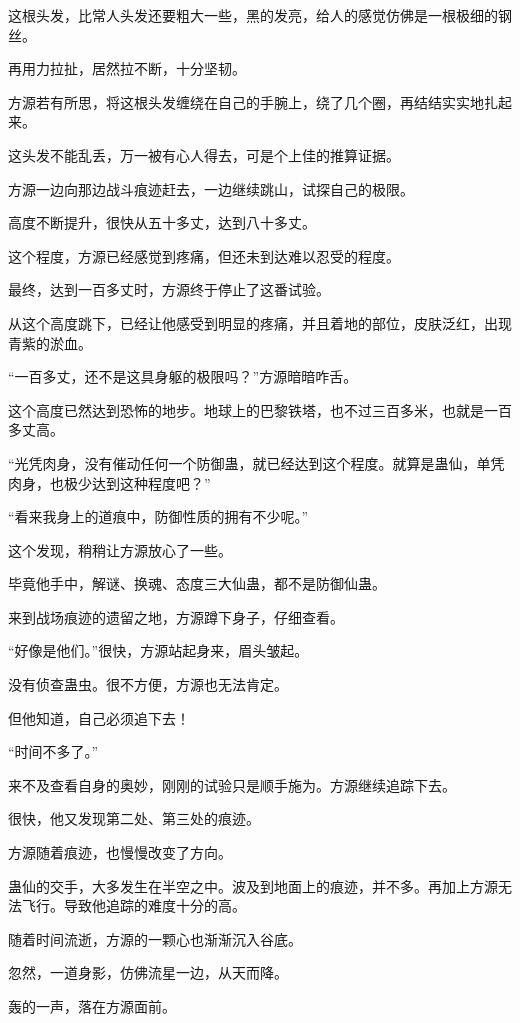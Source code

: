 \begin{this_body}
这根头发，比常人头发还要粗大一些，黑的发亮，给人的感觉仿佛是一根极细的钢丝。

再用力拉扯，居然拉不断，十分坚韧。

方源若有所思，将这根头发缠绕在自己的手腕上，绕了几个圈，再结结实实地扎起来。

这头发不能乱丢，万一被有心人得去，可是个上佳的推算证据。

方源一边向那边战斗痕迹赶去，一边继续跳山，试探自己的极限。

高度不断提升，很快从五十多丈，达到八十多丈。

这个程度，方源已经感觉到疼痛，但还未到达难以忍受的程度。

最终，达到一百多丈时，方源终于停止了这番试验。

从这个高度跳下，已经让他感受到明显的疼痛，并且着地的部位，皮肤泛红，出现青紫的淤血。

“一百多丈，还不是这具身躯的极限吗？”方源暗暗咋舌。

这个高度已然达到恐怖的地步。地球上的巴黎铁塔，也不过三百多米，也就是一百多丈高。

“光凭肉身，没有催动任何一个防御蛊，就已经达到这个程度。就算是蛊仙，单凭肉身，也极少达到这种程度吧？”

“看来我身上的道痕中，防御性质的拥有不少呢。”

这个发现，稍稍让方源放心了一些。

毕竟他手中，解谜、换魂、态度三大仙蛊，都不是防御仙蛊。

来到战场痕迹的遗留之地，方源蹲下身子，仔细查看。

“好像是他们。”很快，方源站起身来，眉头皱起。

没有侦查蛊虫。很不方便，方源也无法肯定。

但他知道，自己必须追下去！

“时间不多了。”

来不及查看自身的奥妙，刚刚的试验只是顺手施为。方源继续追踪下去。

很快，他又发现第二处、第三处的痕迹。

方源随着痕迹，也慢慢改变了方向。

蛊仙的交手，大多发生在半空之中。波及到地面上的痕迹，并不多。再加上方源无法飞行。导致他追踪的难度十分的高。

随着时间流逝，方源的一颗心也渐渐沉入谷底。

忽然，一道身影，仿佛流星一边，从天而降。

轰的一声，落在方源面前。


\end{this_body}
